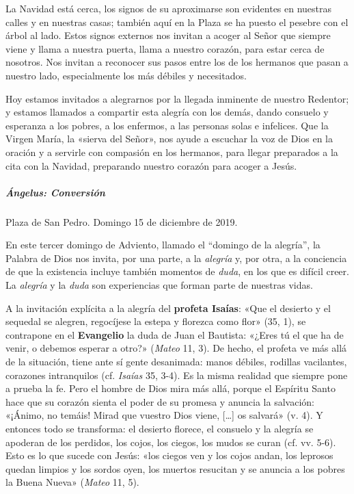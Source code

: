 \documentclass[]{article}
\let\oldsubparagraph\subparagraph
\renewcommand{\subparagraph}[1]{\oldsubparagraph{#1}\mbox{}}
\begin{document}
La Navidad está cerca, los signos de su aproximarse son evidentes en
nuestras calles y en nuestras casas; también aquí en la Plaza se ha
puesto el pesebre con el árbol al lado. Estos signos externos nos
invitan a acoger al Señor que siempre viene y llama a nuestra puerta,
llama a nuestro corazón, para estar cerca de nosotros. Nos invitan a
reconocer sus pasos entre los de los hermanos que pasan a nuestro lado,
especialmente los más débiles y necesitados.

Hoy estamos invitados a alegrarnos por la llegada inminente de nuestro
Redentor; y estamos llamados a compartir esta alegría con los demás,
dando consuelo y esperanza a los pobres, a los enfermos, a las personas
solas e infelices. Que la Virgen María, la «sierva del Señor», nos ayude
a escuchar la voz de Dios en la oración y a servirle con compasión en
los hermanos, para llegar preparados a la cita con la Navidad,
preparando nuestro corazón para acoger a
Jesús.\protect\hypertarget{_Toc448662752}{}{\protect\hypertarget{_Toc448690271}{}{\protect\hypertarget{_Toc448708294}{}{\protect\hypertarget{_Toc448709380}{}{\protect\hypertarget{_Toc449554382}{}{}}}}}

\subparagraph{Ángelus: Conversión}\label{uxe1ngelus-conversiuxf3n}

Plaza de San Pedro.  Domingo 15 de diciembre de 2019.

En este tercer domingo de Adviento, llamado el ``domingo de la
alegría'', la Palabra de Dios nos invita, por una parte, a la
\emph{alegría} y, por otra, a la conciencia de que la existencia incluye
también momentos de \emph{duda}, en los que es difícil creer. La
\emph{alegría} y la \emph{duda} son experiencias que forman parte de
nuestras vidas.

A la invitación explícita a la alegría del \textbf{profeta Isaías}: «Que
el desierto y el sequedal se alegren, regocíjese la estepa y florezca
como flor» (35, 1), se contrapone en el \textbf{Evangelio} la duda de
Juan el Bautista: «¿Eres tú el que ha de venir, o debemos esperar a
otro?» (\emph{Mateo} 11, 3). De hecho, el profeta ve más allá de la
situación, tiene ante sí gente desanimada: manos débiles, rodillas
vacilantes, corazones intranquilos (cf. \emph{Isaías} 35, 3-4). Es la
misma realidad que siempre pone a prueba la fe. Pero el hombre de Dios
mira más allá, porque el Espíritu Santo hace que su corazón sienta el
poder de su promesa y anuncia la salvación: «¡Ánimo, no temáis! Mirad
que vuestro Dios viene, [\ldots{}] os salvará» (v. 4). Y entonces todo se
transforma: el desierto florece, el consuelo y la alegría se apoderan de
los perdidos, los cojos, los ciegos, los mudos se curan (cf. vv. 5-6).
Esto es lo que sucede con Jesús: «los ciegos ven y los cojos andan, los
leprosos quedan limpios y los sordos oyen, los muertos resucitan y se
anuncia a los pobres la Buena Nueva» (\emph{Mateo} 11, 5).
\end{document}

